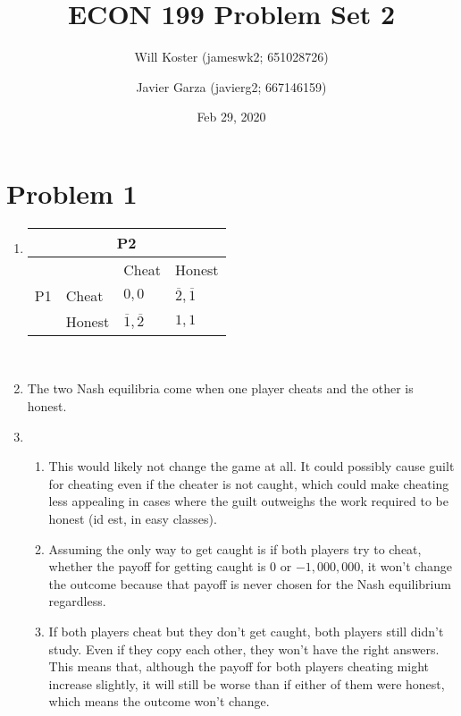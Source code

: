 \documentclass[letterpaper]{article}
\begin{document}
\title{ECON 199 Problem Set 2}
\author{Will Koster (jameswk2; 651028726) \and Javier Garza (javierg2; 667146159)}
\date{Feb 29, 2020}
\maketitle

\clearpage

\section{Problem 1}
\begin{enumerate}
    \item 
\begin{tabular}{|l|l|l|l|}
\multicolumn{4}{c}{P2}                      \\ \hline
\multirow{3}{*}{P1} &   & Cheat        & Honest        \\ \hline
                       & Cheat & $0,0$ & $\overline2, \overline1$ \\ \hline
                       & Honest & $\overline1, \overline2$ & $1,1$ \\ \hline
\end{tabular} \\
\item The two Nash equilibria come when one player cheats and the other is honest.
\item \begin{enumerate}
        \item This would likely not change the game at all. It could possibly cause guilt for cheating even if the cheater is not caught, which could make cheating less appealing in cases where the guilt outweighs the work required to be honest (id est, in easy classes).
        \item Assuming the only way to get caught is if both players try to cheat, whether the payoff for getting caught is $0$ or $-1,000,000$, it won't change the outcome because that payoff is never chosen for the Nash equilibrium regardless.
        \item If both players cheat but they don't get caught, both players still didn't study. Even if they copy each other, they won't have the right answers. This means that, although the payoff for both players cheating might increase slightly, it will still be worse than if either of them were honest, which means the outcome won't change.
    \end{enumerate}
\end{enumerate}
\end{document}
